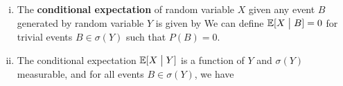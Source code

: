 \documentclass[12pt,aspectratio=169]{beamer}
\begin{document}
\begin{frame}
\begin{Definition}[Continued.]
\begin{enumerate}[(ii)]
\item The \textbf{conditional expectation} of random variable $X$ given any event $B$ generated by random variable $Y$ is given by 
We can define $\mathbb{E}[X\; \big\vert \; B] = 0$ for trivial events $B \in \sigma(Y)$ such that $P(B) = 0$. 

\item<2-> The conditional expectation $\mathbb{E}[X\; \big\vert \; Y]$ is a function of $Y$ and $\sigma(Y)$ measurable, 
and for all events $B \in \sigma(Y)$, we have 

\end{enumerate}
\end{Definition}
\end{frame}
\end{document}
